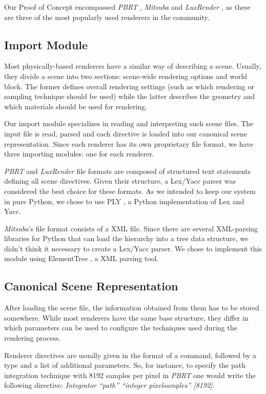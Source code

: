 \documentclass[10pt,conference]{IEEEtran}
\begin{document}
Our Proof of Concept encompassed \textit{PBRT} \cite{pbrt}, \textit{Mitsuba} 
\cite{mitsuba} and \textit{LuxRender} \cite{luxrender}, as these are three of 
the most popularly used renderers in the community.

\subsection{Import Module}
Most physically-based renderers have a similar way of describing a scene. 
Usually, they divide a scene into two sections: scene-wide rendering options and 
world block. The former defines overall rendering settings (such as which 
rendering or sampling technique should be used) while the latter describes the 
geometry and which materials should be used for rendering.

Our import module specializes in reading and interpreting such scene files. The 
input file is read, parsed and each directive is loaded into our canonical scene 
representation. Since each renderer has its own proprietary file format, we have 
three importing modules: one for each renderer.

\textit{PBRT} and \textit{LuxRender} file formats are composed of structured 
text statements defining all scene directives. Given their structure, a Lex/Yacc 
parser was considered the best choice for these formats. As we intended to keep 
our system in pure Python, we chose to use PLY \cite{ply}, a Python 
implementation of Lex and Yacc.

\textit{Mitsuba}'s file format consists of a XML file. Since there are several 
XML-parsing libraries for Python that can load the hierarchy into a tree data 
structure, we didn't think it necessary to create a Lex/Yacc parser. We chose to 
implement this module using ElementTree \cite{ET}, a XML parsing tool.

\subsection{Canonical Scene Representation}
After loading the scene file, the information obtained from them has to be 
stored somewhere. While most renderers have the same base structure, they differ 
in which parameters can be used to configure the techniques used during the 
rendering process. 

Renderer directives are usually given in the format of a command, followed by a 
type and a list of additional parameters. So, for instance, to specify the path 
integration technique with 8192 samples per pixel in \textit{PBRT} one would 
write the following directive: \textit{Integrator ``path'' ``integer 
pixelsamples'' [8192]}.
\end{document}
